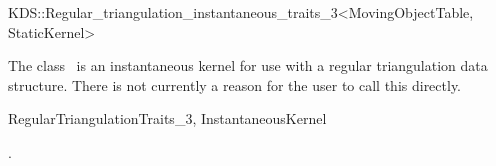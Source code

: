 

\begin{ccRefClass}{KDS::Regular_triangulation_instantaneous_traits_3<MovingObjectTable, StaticKernel>}  %


\ccDefinition
  
The class \ccRefName\ is an instantaneous kernel for use with a
regular triangulation data structure. There is not currently a reason
for the user to call this directly.


\ccIsModel

RegularTriangulationTraits\_3, InstantaneousKernel

\ccSeeAlso

.

\ccExample


\end{ccRefClass}


